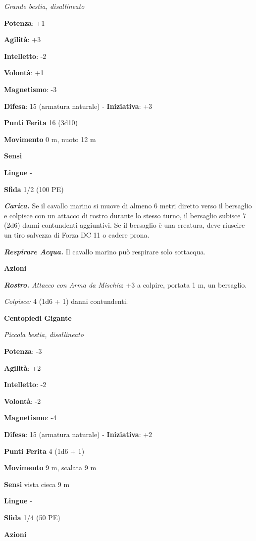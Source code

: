 \begin{multicols}{2}
\emph{Grande bestia, disallineato}

\textbf{Potenza}: +1

\textbf{Agilità}: +3

\textbf{Intelletto}: -2

\textbf{Volontà}: +1

\textbf{Magnetismo}: -3

\textbf{Difesa}: 15 (armatura naturale) - \textbf{Iniziativa}: +3

\textbf{Punti Ferita} 16 (3d10)

\textbf{Movimento} 0 m, nuoto 12 m

\textbf{Sensi} 

\textbf{Lingue} -

\textbf{Sfida} 1/2 (100 PE)\smallskip

\emph{\textbf{Carica.}} Se il cavallo marino si muove di almeno 6 metri
diretto verso il bersaglio e colpisce con un attacco di rostro durante
lo stesso turno, il bersaglio subisce 7 (2d6) danni contundenti
aggiuntivi. Se il bersaglio è una creatura, deve riuscire un tiro
salvezza di Forza DC 11 o cadere prona.

\emph{\textbf{Respirare Acqua.}} Il cavallo marino può respirare solo
sottacqua.

\smallskip\textbf{Azioni}

\emph{\textbf{Rostro.} Attacco con Arma da Mischia}: +3 a colpire,
portata 1 m, un bersaglio.

\emph{Colpisce:} 4 (1d6 + 1) danni contundenti.

\textbf{Centopiedi Gigante}

\emph{Piccola bestia, disallineato}

\textbf{Potenza}: -3

\textbf{Agilità}: +2

\textbf{Intelletto}: -2

\textbf{Volontà}: -2

\textbf{Magnetismo}: -4

\textbf{Difesa}: 15 (armatura naturale) - \textbf{Iniziativa}: +2

\textbf{Punti Ferita} 4 (1d6 + 1)

\textbf{Movimento} 9 m, scalata 9 m

\textbf{Sensi} vista cieca 9 m

\textbf{Lingue} -

\textbf{Sfida} 1/4 (50 PE)\smallskip

\smallskip\textbf{Azioni}


\end{multicols}
